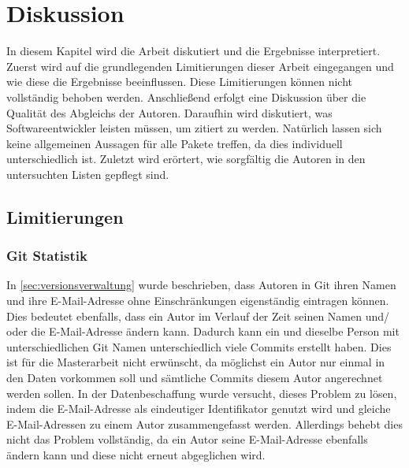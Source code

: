 \chapter{Diskussion}
\label{chap:diskussion}
In diesem Kapitel wird die Arbeit diskutiert und die Ergebnisse interpretiert.
Zuerst wird auf die grundlegenden Limitierungen dieser Arbeit eingegangen und wie diese die Ergebnisse beeinflussen.
Diese Limitierungen können nicht vollständig behoben werden.
Anschließend erfolgt eine Diskussion über die Qualität des Abgleichs der Autoren.
Daraufhin wird diskutiert, was Softwareentwickler leisten müssen, um zitiert zu werden.
Natürlich lassen sich keine allgemeinen Aussagen für alle Pakete treffen, da dies individuell unterschiedlich ist.
Zuletzt wird erörtert, wie sorgfältig die Autoren in den untersuchten Listen gepflegt sind.

\section{Limitierungen}
\label{sec:limitierungen}
\subsection*{Git Statistik}
\label{subsec:git_statistik}
In \autoref{sec:versionsverwaltung} wurde beschrieben, dass Autoren in Git ihren Namen und ihre E-Mail-Adresse ohne Einschränkungen eigenständig eintragen können.
Dies bedeutet ebenfalls, dass ein Autor im Verlauf der Zeit seinen Namen und/ oder die E-Mail-Adresse ändern kann.
Dadurch kann ein und dieselbe Person mit unterschiedlichen Git Namen unterschiedlich viele Commits erstellt haben.
Dies ist für die Masterarbeit nicht erwünscht, da möglichst ein Autor nur einmal in den Daten vorkommen soll und sämtliche Commits diesem Autor angerechnet werden sollen.
In der Datenbeschaffung wurde versucht, dieses Problem zu lösen, indem die E-Mail-Adresse als eindeutiger Identifikator genutzt wird und gleiche E-Mail-Adressen zu einem Autor zusammengefasst werden.
Allerdings behebt dies nicht das Problem vollständig, da ein Autor seine E-Mail-Adresse ebenfalls ändern kann und diese nicht erneut abgeglichen wird.

